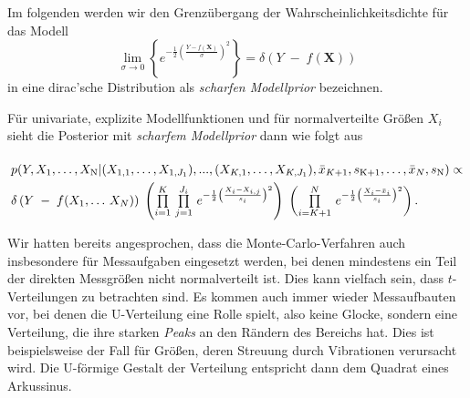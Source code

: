 Im folgenden werden wir den Grenzübergang der Wahrscheinlichkeitsdichte für das Modell
\begin{equation}
\lim_{\sigma \rightarrow 0} \left\{ e^{-\frac{1}{2} \left(\frac{Y-f(\mathbf{X})}{\sigma}\right)^2} \right\}
= \delta\left(Y \; - \;f(\mathbf{X})\right)
\end{equation}
in eine dirac'sche Distribution als \textsl{scharfen Modellprior} bezeichnen.

Für univariate, explizite Modellfunktionen und für normalverteilte Größen $X_i$ sieht die
Posterior mit \textsl{scharfem Modellprior} dann wie folgt aus
\begin{equation}
\arraycolsep=2.0pt\def\arraystretch{2.0}
\begin{array}{l}
p(Y, X_\mathrm{1}, \dots, X_\mathrm{N} | (X_{1,1}, \dots, X_{1,J_1}), ..., (X_{K,1}, \dots, X_{K,J_1}),
 \bar x_{K+1}, s_\mathrm{K+1}, \dots, \bar x_{N}, s_\mathrm{N}) \propto \\
\delta\left(Y \; - \; f(X_1, \dots \, X_N)\right)
\; \left( \prod\limits_{i=1}^K \, \prod\limits_{j=1}^{J_i}  \,
e^{-\frac{1}{2} \left(\frac{ X_i - X_{i,j} }{s_i} \right)^2} \right)
\;  \left( \prod\limits_{i=K+1}^N \,  e^{-\frac{1}{2} \left(\frac{X_i - \bar x_i}{s_i} \right)^2} \right) .
\end{array}
\label{PosteriorFall4allgemeiner}
\end{equation}


Wir hatten bereits angesprochen, dass die Monte-Carlo-Verfahren auch insbesondere
für Messaufgaben eingesetzt werden, bei denen mindestens ein Teil der direkten Messgrößen nicht normalverteilt ist.
Dies kann vielfach sein, dass $t$-Verteilungen zu betrachten sind. Es kommen auch immer wieder Messaufbauten
vor, bei denen die U-Verteilung eine Rolle spielt, also keine Glocke, sondern
eine Verteilung, die ihre starken \textsl{Peaks} an den Rändern des Bereichs hat. Dies ist beispielsweise der
Fall für Größen, deren Streuung durch Vibrationen verursacht wird. Die U-förmige Gestalt der Verteilung entspricht dann
dem Quadrat eines Arkussinus.

